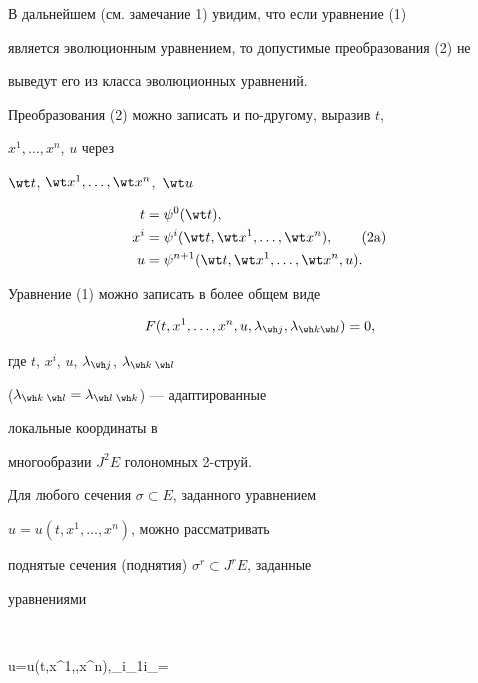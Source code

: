  


В дальнейшем (см. замечание 1) увидим, что если уравнение (1) 


является эволюционным уравнением, то допустимые преобразования (2) не 


выведут его из класса эволюционных уравнений. 


 


Преобразования (2) можно записать и по-другому, выразив $t$, 


$x^1,\dotsc,x^n$, $u$ через 


$\wt t$, $\wt x^1,\dotsc,\wt x^n$,~$\wt u$ 


\begin{align} 


t&=\psi^0(\wt t),\notag\\ 


x^i&=\psi^i(\wt t,\wt x^1,\dotsc,\wt x^n),\tag{2a}\\ 


u&=\psi^{n+1}(\wt t,\wt x^1,\dotsc,\wt x^n,u).\notag 


\end{align} 


 


Уравнение (1) можно записать в более общем виде 


\begin{equation} 


F(t,x^1,\dotsc,x^n,u,\lambda_{\wh j},\lambda_{\wh k\wh l})=0, 


\end{equation} 


где $t$, $x^i$, $u$, $\lambda_{\wh j}$, $\lambda_{\wh k\;\wh l}$ 


($\lambda_{\wh k\;\wh l}=\lambda_{\wh l\;\wh k}$) --- адаптированные 


локальные координаты в 


многообразии $J^2E$ голономных 2-струй. 


 


Для любого сечения $\sigma\subset E$, заданного уравнением 


$u=u(t,x^1,\dotsc,x^n)$, можно рассматривать 


поднятые сечения (поднятия) $\sigma^r\subset J^r E$, заданные 


уравнениями 


$$ 


u=u(t,x^1,\dotsc,x^n),\quad \lambda_{\wh i_1\dotsc\wh i_\alpha}= 


